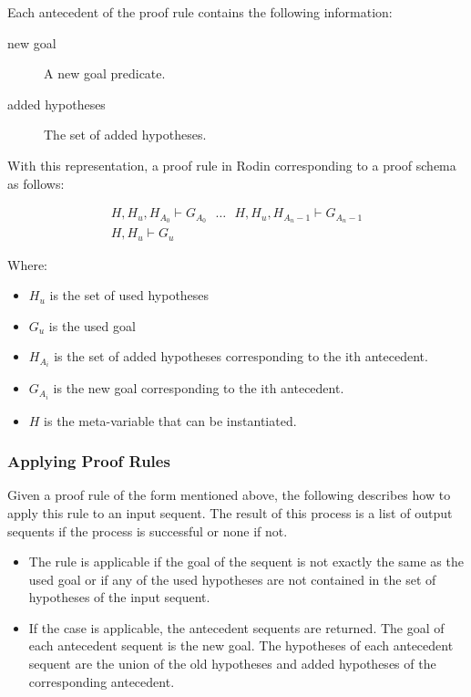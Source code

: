 Each antecedent of the proof rule contains the following information:

\begin{description}
	\item[new goal] A new goal predicate. 
	\item[added hypotheses] The set of added hypotheses. 
\end{description}

With this representation, a proof rule in Rodin corresponding to a proof schema as follows: 

$$\begin{array}{c} H, H_u, H_{A_0} \vdash G_{A_0} ~~~\ldots~~~ H, H_u, H_{A_n-1} \vdash G_{A_n-1} \\ \hline H, H_u \vdash G_u \end{array} $$

Where:
\begin{itemize}
	\item     $H_u$ is the set of used hypotheses 
	\item     $G_u$ is the used goal 
	\item     $H_{A_i}$ is the set of added hypotheses corresponding to the ith antecedent. 
	\item     $G_{A_i}$ is the new goal corresponding to the ith antecedent. 
	\item     $H$ is the meta-variable that can be instantiated. 
\end{itemize}

\subsubsection{Applying Proof Rules}

Given a proof rule of the form mentioned above, the following describes how to apply this rule to an input sequent. The result of this process is a list of output sequents if the process is successful or none if not.

\begin{itemize}
	\item The rule is applicable if the goal of the sequent is not exactly the same as the used goal or if any of the used hypotheses are not contained in the set of hypotheses of the input sequent. 
	\item If the case is applicable, the antecedent sequents are returned. The goal of each antecedent sequent is the new goal. The hypotheses of each antecedent sequent are the union of the old hypotheses and added hypotheses of the corresponding antecedent. 
\end{itemize}


